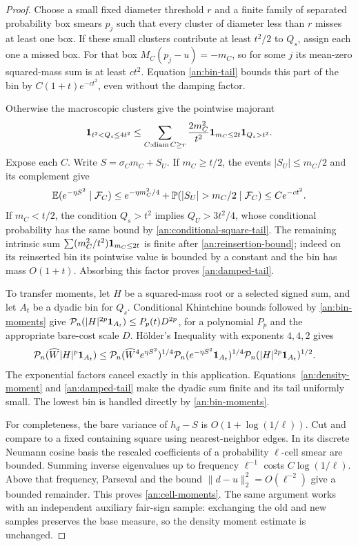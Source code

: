 \begin{proof}
Choose a small fixed diameter threshold $r$ and a finite family of
separated probability box smears $p_j$ such that every cluster of
diameter less than $r$ misses at least one box.  If these small
clusters contribute at least $t^2/2$ to $Q_s$, assign each one a
missed box.  For that box $M_C(p_j-u)=-m_C$, so for some $j$ its
mean-zero squared-mass sum is at least $ct^2$.  Equation
\eqref{an:bin-tail} bounds this part of the bin by
$C(1+t)e^{-ct^2}$, even without the damping factor.

Otherwise the macroscopic clusters give the pointwise majorant
\[
 \mathbf 1_{t^2<Q_s\le4t^2}
 \le \sum_{C:\operatorname{diam} C\ge r}
     \frac{2m_C^2}{t^2}\mathbf 1_{m_C\le2t}\mathbf 1_{Q_s>t^2}.
\]
Expose each $C$.  Write $S=\sigma_Cm_C+S_U$.
If $m_C\ge t/2$, the events $|S_U|\le m_C/2$ and its complement
give
\[
 \E(e^{-\eta S^2}\mid\mathcal F_C)
 \le e^{-\eta m_C^2/4}+\Prob(|S_U|>m_C/2\mid\mathcal F_C)
 \le Ce^{-ct^2}.
\]
If $m_C<t/2$, the condition $Q_s>t^2$ implies
$Q_U>3t^2/4$, whose conditional probability has the same bound by
\eqref{an:conditional-square-tail}.  The remaining intrinsic sum
$\sum (m_C^2/t^2)\mathbf 1_{m_C\le2t}$ is finite after
\eqref{an:reinsertion-bound}; indeed on its reinserted bin its
pointwise value is bounded by a constant and the bin has mass
$O(1+t)$.  Absorbing this factor proves \eqref{an:damped-tail}.

To transfer moments, let $H$ be a squared-mass root or a selected
signed sum, and let $A_t$ be a dyadic bin for $Q_s$.  Conditional
Khintchine bounds followed by \eqref{an:bin-moments} give
$\mathcal P_n(|H|^{2p}\mathbf 1_{A_t})\le P_p(t)D^{2p}$, for a
polynomial $P_p$ and the appropriate bare-cost scale $D$.
H\"older's Inequality with exponents $4,4,2$ gives
\begin{align*}
 \mathcal P_n(\widehat W|H|^p\mathbf 1_{A_t})
 &\le
 \mathcal P_n(\widehat W^4e^{\eta S^2})^{1/4}
 \mathcal P_n(e^{-\eta S^2}\mathbf 1_{A_t})^{1/4}
 \mathcal P_n(|H|^{2p}\mathbf 1_{A_t})^{1/2}.
\end{align*}
The exponential factors cancel exactly in this application.
Equations~\eqref{an:density-moment} and \eqref{an:damped-tail}
make the dyadic sum finite and its tail uniformly small.  The
lowest bin is handled directly by \eqref{an:bin-moments}.

For completeness, the bare variance of $h_d-S$ is
$O(1+\log(1/\ell))$.  Cut and compare to a fixed containing square
using nearest-neighbor edges.  In its discrete Neumann cosine
basis the rescaled coefficients of a probability $\ell$-cell
smear are bounded.  Summing inverse eigenvalues up to frequency
$\ell^{-1}$ costs $C\log(1/\ell)$.  Above that frequency,
Parseval and the bound $\|d-u\|_2^2=O(\ell^{-2})$ give a bounded
remainder.  This proves \eqref{an:cell-moments}.  The same argument
works with an independent auxiliary fair-sign sample: exchanging
the old and new samples preserves the base measure, so the density
moment estimate is unchanged.
\end{proof}

